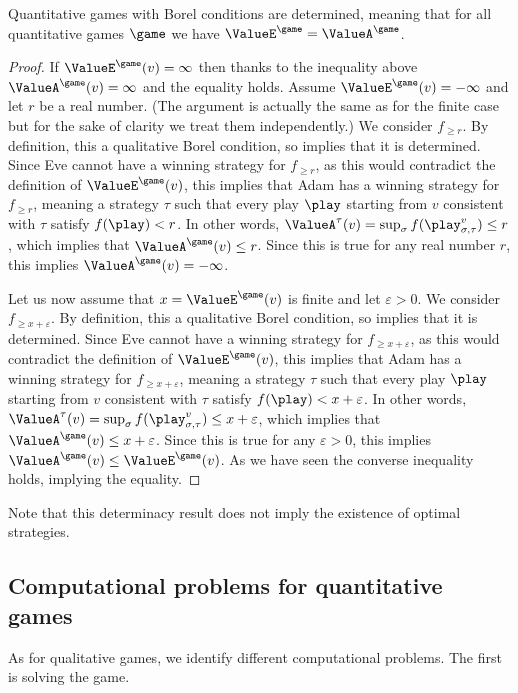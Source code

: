 \begin{corollary}
\label{1-cor:borel_determinacy}
Quantitative games with Borel conditions are determined, meaning that
for all quantitative games $\game$ we have $\ValueE^{\game} = \ValueA^{\game}$.
\end{corollary}
\begin{proof}
If $\ValueE^{\game}(v) = \infty$ then thanks to the inequality above $\ValueA^{\game}(v) = \infty$ and the equality holds.
Assume $\ValueE^{\game}(v) = -\infty$ and let $r$ be a real number.
(The argument is actually the same as for the finite case but for the sake of clarity we treat them independently.)
We consider $f_{\ge r}$.
By definition, this a qualitative Borel condition, so  implies that it is determined.
Since Eve cannot have a winning strategy for $f_{\ge r}$, as this would contradict the definition of $\ValueE^{\game}(v)$,
this implies that Adam has a winning strategy for $f_{\ge r}$, 
meaning a strategy $\tau$ such that every play $\play$ starting from $v$ consistent with $\tau$ satisfy $f(\play) < r$.
In other words, $\ValueA^{\tau}(v) = \sup_{\sigma} f(\play_{\sigma,\tau}^{v}) \le r$, which implies that $\ValueA^{\game}(v) \le r$.
Since this is true for any real number $r$, this implies $\ValueA^{\game}(v) = -\infty$.

Let us now assume that $x = \ValueE^{\game}(v)$ is finite and let $\varepsilon > 0$.
We consider $f_{\ge x + \varepsilon}$.
By definition, this a qualitative Borel condition, so  implies that it is determined.
Since Eve cannot have a winning strategy for $f_{\ge x + \varepsilon}$, as this would contradict the definition of $\ValueE^{\game}(v)$,
this implies that Adam has a winning strategy for $f_{\ge x + \varepsilon}$, 
meaning a strategy $\tau$ such that every play $\play$ starting from $v$ consistent with $\tau$ satisfy $f(\play) < x + \varepsilon$.
In other words, $\ValueA^{\tau}(v) = \sup_{\sigma} f(\play_{\sigma,\tau}^{v}) \le x + \varepsilon$, which implies that $\ValueA^{\game}(v) \le x + \varepsilon$.
Since this is true for any $\varepsilon > 0$, this implies $\ValueA^{\game}(v) \le \ValueE^{\game}(v)$.
As we have seen the converse inequality holds, implying the equality.
\end{proof}

Note that this determinacy result does not imply the existence of optimal strategies.

\subsection*{Computational problems for quantitative games}
As for qualitative games, we identify different computational problems.
The first is solving the game.

